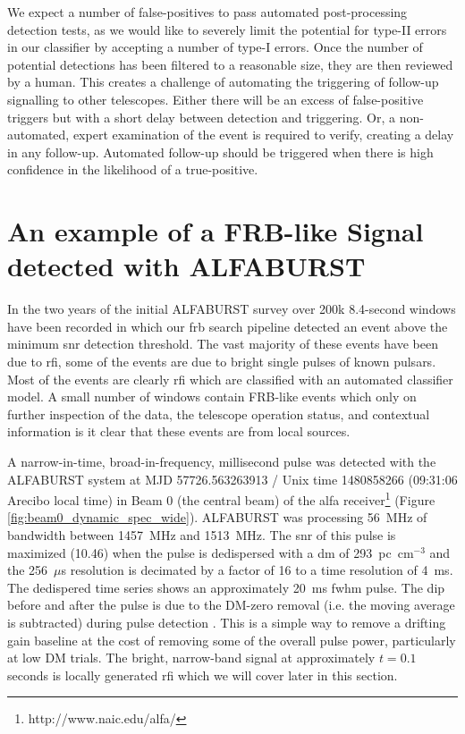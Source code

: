 \documentclass[a4paper,fleqn,usenatbib]{mnras}
\begin{document}
We expect a number of false-positives to pass automated post-processing detection
tests, as we would like to severely limit the potential for type-II errors in
our classifier by accepting a number of type-I errors. Once the number of
potential detections has been filtered to a reasonable size, they are then
reviewed by a human. This creates a challenge of automating the triggering of
follow-up signalling to other telescopes. Either there will be an excess of
false-positive triggers but with a short delay between detection and triggering.
Or, a non-automated, expert examination of the event is required to verify,
creating a delay in any follow-up. Automated follow-up should be triggered when
there is high confidence in the likelihood of a true-positive.

\section{An example of a FRB-like Signal detected with ALFABURST}
\label{sec:D20161204}

In the two years of the initial ALFABURST survey \citep{2017ApJS..228...21C} over
200k 8.4-second windows have been recorded in which our \gls{frb} search pipeline
detected an event above the minimum \gls{snr} detection threshold. The vast
majority of these events have been due to \gls{rfi}, some of the events are due
to bright single pulses of known pulsars. Most of the events are
clearly \gls{rfi} which are classified with an automated classifier model. A
small number of windows contain FRB-like events which only on further inspection
of the data, the telescope operation status, and contextual information is it
clear that these events are from local sources.

A narrow-in-time, broad-in-frequency, millisecond pulse was detected with the
ALFABURST system at MJD 57726.563263913 / Unix time 1480858266 (09:31:06
Arecibo local time) in Beam 0 (the central beam) of the \gls{alfa}
receiver\footnote{http://www.naic.edu/alfa/} (Figure
\ref{fig:beam0_dynamic_spec_wide}). ALFABURST was processing 56~MHz of
bandwidth between 1457~MHz and 1513~MHz. The \gls{snr} of this pulse is
maximized (10.46) when the pulse is dedispersed with a \gls{dm} of
293~pc~cm$^{-3}$ and the 256~$\mu$s resolution is decimated by a factor of 16 to
a time resolution of 4~ms. The dedispered time series shows an approximately 20~ms
\gls{fwhm} pulse. The dip before and after the pulse is due to the DM-zero
removal (i.e. the moving average is subtracted) during pulse detection
\citep{2009MNRAS.395..410E}. This is a simple way to remove a drifting gain
baseline at the cost of removing some of the overall pulse power, particularly
at low DM trials. The bright, narrow-band signal at approximately $t=0.1$
seconds is locally generated \gls{rfi} which we will cover later in this
section.
\end{document}
